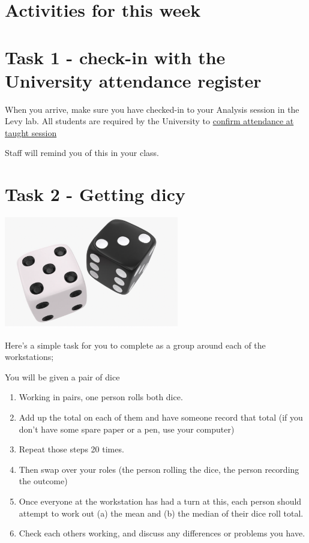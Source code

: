\documentclass[
]{book}
\begin{document}
\hypertarget{activities-for-this-week}{%
\section{Activities for this week}\label{activities-for-this-week}}

\hypertarget{task-1---check-in-with-the-university-attendance-register}{%
\section{Task 1 - check-in with the University attendance register}\label{task-1---check-in-with-the-university-attendance-register}}

When you arrive, make sure you have checked-in to your Analysis session in the Levy lab. All students are required by the University to \href{https://www.lancaster.ac.uk/student-and-education-services/check-in/}{confirm attendance at taught session}

Staff will remind you of this in your class.

\hypertarget{task-2---getting-dicy}{%
\section{Task 2 - Getting dicy}\label{task-2---getting-dicy}}

\includegraphics[width=3in,height=\textheight]{files/Week_1/dice.png}

Here's a simple task for you to complete as a group around each of the workstations;

You will be given a pair of dice

\begin{enumerate}
\def\labelenumi{\arabic{enumi}.}
\item
  Working in pairs, one person rolls both dice.
\item
  Add up the total on each of them and have someone record that total (if you don't have some spare paper or a pen, use your computer)
\item
  Repeat those steps 20 times.
\item
  Then swap over your roles (the person rolling the dice, the person recording the outcome)
\item
  Once everyone at the workstation has had a turn at this, each person should attempt to work out (a) the mean and (b) the median of their dice roll total.
\item
  Check each others working, and discuss any differences or problems you have.
\end{enumerate}
\end{document}

